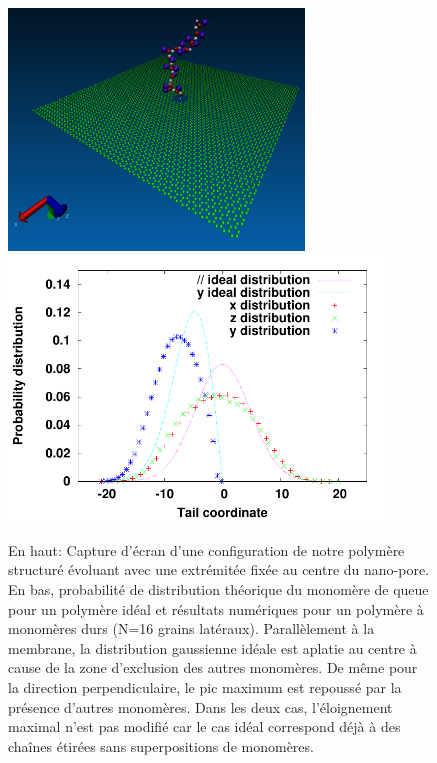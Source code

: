 \begin{figure}[H]
\begin{center}


\includegraphics[width=0.7\textwidth]{confinit.jpg}
\includegraphics[width=0.9\textwidth]{probdistribution.pdf}


\caption[Polymère greffé sur une membrane]{En haut: Capture d'écran d'une configuration de notre polymère structuré évoluant avec une extrémitée fixée au centre du nano-pore. En bas, probabilité de distribution théorique du monomère de queue pour un polymère idéal et résultats numériques pour un polymère à monomères durs (N=16 grains latéraux). Parallèlement à la membrane, la distribution gaussienne idéale est aplatie au centre à cause de la zone d'exclusion des autres monomères. De même pour la direction perpendiculaire, le pic maximum est repoussé par la présence d'autres monomères. Dans les deux cas, l'éloignement maximal n'est pas modifié car le cas idéal correspond déjà à des chaînes étirées sans superpositions de monomères. }
\label{polagainstwall}
\end{center}
\end{figure}


